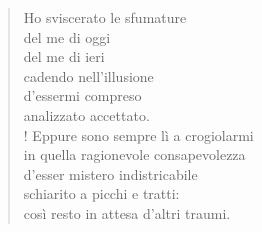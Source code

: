 

\begin{verse}
    Ho sviscerato le sfumature\\
    del me di oggi\\
    del me di ieri\\
    cadendo nell'illusione\\
    d'essermi compreso\\
    analizzato accettato.\\!
    Eppure sono sempre lì a crogiolarmi\\
    in quella ragionevole consapevolezza\\
    d'esser mistero indistricabile\\
    schiarito a picchi e tratti:\\
    così resto in attesa d'altri traumi.    
\end{verse}